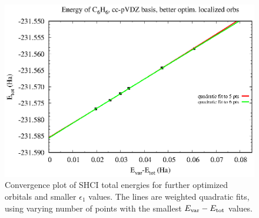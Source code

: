 \documentclass[journal=jcp,manuscript=suppinfo]{achemso}
\begin{document}
\begin{figure}[ht!]
\begin{center}
\includegraphics[scale=1.0]{figures/shci/energy_conv_C6H6_3b.eps}
\caption{Convergence plot of SHCI total energies for further optimized orbitals and smaller $\epsilon_1$ values.
The lines are weighted quadratic fits, using varying number of points with the smallest $E_{\rm var}-E_{\rm tot}$ values.}
\label{fig:shci_energy_later}
\end{center}
\end{figure}

\clearpage
\end{document}
